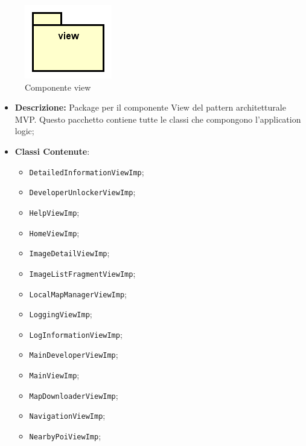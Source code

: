 \documentclass[../DefinizioneDiProdotto.tex]{subfiles}
\begin{document}
    \begin{figure}[H]
        \centering
        \includegraphics{img/package/view.png}
        \caption{Componente view}\label{fig:view} 
    \end{figure}
    \begin{itemize}
\item \textbf{Descrizione:} Package per il componente View del pattern architetturale MVP. Questo pacchetto contiene tutte le classi che compongono l'application logic;
\item \textbf{Classi Contenute}:
\begin{itemize}
\item \texttt{DetailedInformationViewImp};

\item \texttt{DeveloperUnlockerViewImp};

\item \texttt{HelpViewImp};

\item \texttt{HomeViewImp};

\item \texttt{ImageDetailViewImp};

\item \texttt{ImageListFragmentViewImp};

\item \texttt{LocalMapManagerViewImp};

\item \texttt{LoggingViewImp};

\item \texttt{LogInformationViewImp};

\item \texttt{MainDeveloperViewImp};

\item \texttt{MainViewImp};

\item \texttt{MapDownloaderViewImp};

\item \texttt{NavigationViewImp};

\item \texttt{NearbyPoiViewImp};


\end{itemize}
\end{itemize}
\end{document}
